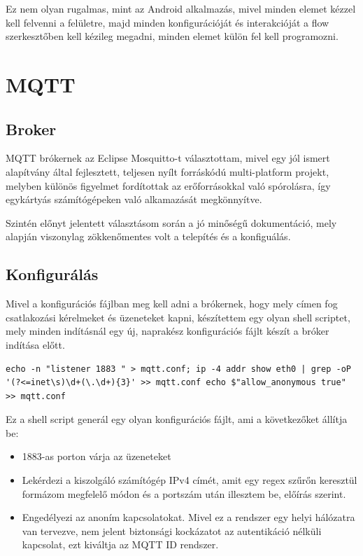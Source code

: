 \documentclass[
]{thesis-ekf}
\theoremstyle{definition}
\theoremstyle{remark}
\begin{document}
Ez nem olyan rugalmas, mint az Android alkalmazás, mivel minden
elemet kézzel kell felvenni a felületre, majd minden konfigurációját és interakcióját a flow szerkesztőben kell kézileg megadni, minden elemet külön fel kell programozni.

\section{MQTT}
\subsection{Broker}
MQTT brókernek az Eclipse Mosquitto\cite{mosquitto}-t választottam, mivel egy jól ismert alapítvány által fejlesztett, teljesen nyílt forráskódú multi-platform projekt,
melyben különös figyelmet fordítottak az erőforrásokkal való spórolásra, így egykártyás számítógépeken való alkamazását megkönnyítve. 

Szintén előnyt jelentett választásom során a jó minőségű dokumentáció, mely alapján
viszonylag zökkenőmentes volt a telepítés és a konfiguálás.
\subsection{Konfigurálás}
Mivel a konfigurációs fájlban meg kell adni a brókernek, hogy mely címen fog csatlakozási kérelmeket és üzeneteket kapni,
készítettem egy olyan shell scriptet, mely minden indításnál egy új, naprakész konfigurációs fájlt készít a bróker indítása előtt.

\lstset{language=bash}  
\begin{lstlisting}[frame=single]
echo -n "listener 1883 " > mqtt.conf; ip -4 addr show eth0 | grep -oP '(?<=inet\s)\d+(\.\d+){3}' >> mqtt.conf echo $"allow_anonymous true" >> mqtt.conf
\end{lstlisting}

Ez a shell script generál egy olyan konfigurációs fájlt, ami a következőket állítja be:
\begin{itemize}
	\item 1883-as porton várja az üzeneteket
	\item Lekérdezi a kiszolgáló számítógép IPv4 címét, amit egy regex szűrőn keresztül formázom megfelelő módon és a portszám után illesztem be, előírás szerint.
	\item Engedélyezi az anoním kapcsolatokat. Mivel ez a rendszer egy helyi hálózatra van tervezve, nem jelent biztonsági kockázatot az autentikáció nélküli kapcsolat, ezt kiváltja az MQTT ID rendszer.
\end{itemize}
\end{document}
